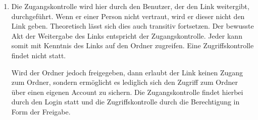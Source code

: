 \documentclass[ngerman]{fbi-aufgabenblatt}
\begin{document}
\begin{enumerate}
		\item
		Die Zugangskontrolle wird hier durch den Benutzer, der den Link weitergibt, durchgeführt. Wenn er einer Person nicht vertraut, wird er dieser nicht den Link geben. Theoretisch lässt sich dies auch transitiv fortsetzen. Der bewusste Akt der Weitergabe des Links entspricht der Zugangskontrolle. Jeder kann somit mit Kenntnis des Links auf den Ordner zugreifen. Eine Zugriffskontrolle findet nicht statt.
		
		Wird der Ordner jedoch freigegeben, dann erlaubt der Link keinen Zugang zum Ordner, sondern ermöglicht es lediglich sich den Zugriff zum Ordner über einen eigenen Account zu sichern. Die Zugangskontrolle findet hierbei durch den Login statt und die Zugriffskontrolle durch die Berechtigung in Form der Freigabe.
	\end{enumerate}
	
\newpage 
{}

	\subsection{}
	
	
\end{document}

